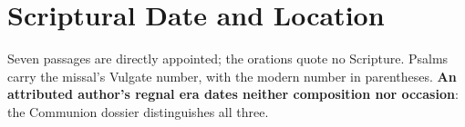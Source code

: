 \section*{Scriptural Date and Location}

{\footnotesize Seven passages are directly appointed; the orations quote no
Scripture. Psalms carry the missal's Vulgate number, with the modern number in
parentheses. \textbf{An attributed author's regnal era dates neither composition
nor occasion}: the Communion dossier distinguishes all three.\par}

\begingroup
\footnotesize
\renewcommand{\arraystretch}{1.02}
\setlength{\LTpre}{0pt}
\setlength{\LTpost}{0pt}
